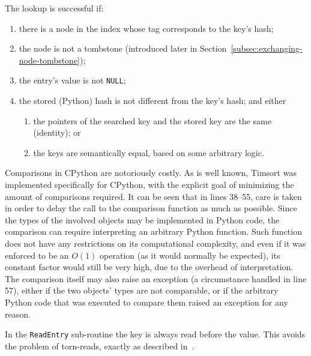 The lookup is successful if:
\begin{enumerate}
    \item there is a node in the index whose tag corresponds to the key's hash;
    \item the node is not a tombstone (introduced later in Section~\ref{subsec:exchanging-node-tombstone});
    \item the entry's value is not \texttt{NULL};
    \item the stored (Python) hash is not different from the key's hash; and either
    \begin{enumerate}
        \item the pointers of the searched key and the stored key are the same (identity); or
        \item the keys are semantically equal, based on some arbitrary logic.
    \end{enumerate}
\end{enumerate}

Comparisons in CPython are notoriously costly.
As is well known, Timsort was implemented specifically for CPython, with the explicit goal of minimizing the amount of comparisons required.
It can be seen that in lines 38--55, care is taken in order to delay the call to the comparison function as much as possible.
Since the types of the involved objects may be implemented in Python code, the comparison can require interpreting an arbitrary Python function.
Such function does not have any restrictions on its computational complexity, and even if it was enforced to be an $O(1)$ operation (as it would normally be expected), its constant factor would still be very high, due to the overhead of interpretation.
The comparison itself may also raise an exception (a circumstance handled in line 57), either if the two objects' types are not comparable, or if the arbitrary Python code that was executed to compare them raised an exception for any reason.

In the \texttt{ReadEntry} sub-routine the key is always read before the value.
This avoids the problem of torn-reads, exactly as described in~\cite[\S4, Lookup]{maier}.

